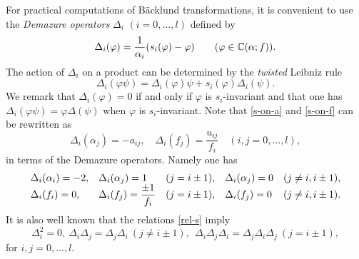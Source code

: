 \medskip
For practical computations of B\"acklund transformations, 
it is convenient to use the {\em Demazure operators\/}
$\Delta_i$ $(i=0,\ldots,l)$ defined by
\begin{equation}
\Delta_i(\varphi)=\frac{1}{\alpha_i}
(s_i(\varphi)-\varphi)\qquad (\varphi\in {\Bbb C}(\alpha;f)). 
\end{equation}
The action of $\Delta_i$ on a product can be determined 
by the {\em twisted\/} Leibniz rule
\begin{equation}
\Delta_i(\varphi\psi)=\Delta_i(\varphi) \psi+s_i(\varphi) \Delta_i(\psi).  
\end{equation}
We remark that $\Delta_i(\varphi)=0$ if and only if $\varphi$ is 
$s_i$-invariant and that one has 
$\Delta_i(\varphi\psi)=\varphi \Delta(\psi)$ 
when $\varphi$ is $s_i$-invariant.
Note that \eqref{s-on-a} and \eqref{s-on-f} can be rewritten as 
\begin{equation}
\Delta_i(\alpha_j)=-a_{ij},\quad \Delta_i(f_j)=\frac{u_{ij}}{f_i}
\quad(i,j=0,\ldots,l), 
\end{equation}
in terms of the Demazure operators. 
Namely one has
\begin{equation}\Label{D-on-sf}
\begin{array}{lllll}
\Delta_i(\alpha_i)=-2, 
&\Delta_i(\alpha_{j})=1&(j=i\pm 1),
&\Delta_i(\alpha_{j})=0&(j\ne i,i\pm1 ),\\
\Delta_i(f_i)=0,
&\Delta_i(f_j)=\displaystyle{\frac{\pm1}{f_i}}&(j=i\pm 1),
&\Delta_i(f_j)=0&(j\ne i,i\pm1). 
\end{array}
\end{equation}
It is also well known that the relations 
\eqref{rel-s} imply 
\begin{equation}
\Delta_i^2=0,\ \Delta_i \Delta_j =\Delta_j \Delta_i \ (j\ne i\pm 1),\ \ 
\Delta_i \Delta_j \Delta_i=\Delta_j \Delta_i \Delta_j \  (j=i\pm 1), 
\end{equation}
for $i,j=0,\ldots,l$. 

